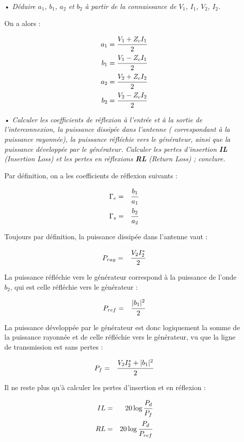\documentclass[10pt]{article}
\begin{document}
\begin{itemize}
    \item[•] \textit{Déduire $a_1$, $b_1$, $a_2$ et $b_2$ à partir de la connaissance de $V_1$, $I_1$, $V_2$, $I_2$.}

        On a alors :

        \begin{eqnarray}
            a_1 = \cfrac{ V_1 + Z_c I_1}{2} \\
            b_1 = \cfrac{ V_1 - Z_c I_1}{2} \\
            a_2 = \cfrac{ V_2 + Z_c I_2}{2} \\
            b_2 = \cfrac{ V_2 - Z_c I_2}{2}
        \end{eqnarray}

    \item[•] \textit{Calculer les coefficients de réflexion à l'entrée et à la sortie de l'interconnexion, la puissance dissipée dans l'antenne ( correspondant à la puissance rayonnée), la puissance réfléchie vers le générateur, ainsi que la puissance développée par le générateur. Calculer les pertes d'insertion \textbf{IL} (\emph{Insertion Loss}) et les pertes en réflexions \textbf{RL} (\emph{Return Loss}) ; conclure.}

        Par définition, on a les coefficients de réflexion suivants :

        \begin{eqnarray}
            \Gamma_e &=& \cfrac{b_1}{a_1} \\
            \Gamma_s &=& \cfrac{b_2}{a_2}
        \end{eqnarray}

        Toujours par définition, la puissance dissipée dans l'antenne vaut :

        \begin{eqnarray}
            P_{ray} &=& \cfrac{V_2 I_2^*}{2}
        \end{eqnarray}

        La puissance réfléchie vers le générateur correspond à la puissance de l'onde $b_2$, qui est celle réfléchie vers le générateur :

        \begin{eqnarray}
            P_{ref} &=& \cfrac{|b_1|^2}{2}
        \end{eqnarray}

        La puissance développée par le générateur est donc logiquement la somme de la puissance rayonnée et de celle réfléchie vers le générateur, vu que la ligne de transmission est sans pertes :

        \begin{eqnarray}
            P_f &=&  \cfrac{V_2 I_2^* + |b_1|^2}{2}
        \end{eqnarray}

        Il ne reste plus qu'à calculer les pertes d'insertion et en réflexion :

        \begin{eqnarray}
            IL &=& 20 \log \cfrac{P_d}{P_f} \\
            RL &=& 20 \log \cfrac{P_d}{P_{ref}}
        \end{eqnarray}

\end{itemize}
\end{document}
